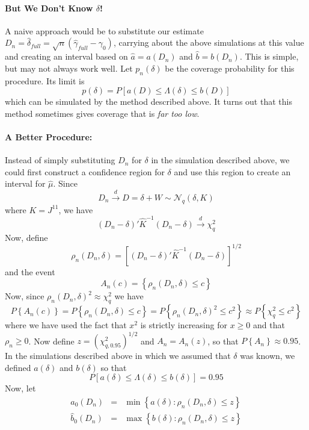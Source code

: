 \paragraph{But We Don't Know $\delta$!} A naive approach would be to substitute our estimate $D_n = \hat{\delta}_{full} = \sqrt{n}(\hat{\gamma}_{full} - \gamma_0)$, carrying about the above simulations at this value and creating an interval based on $\hat{a} = a(D_n)$ and $\hat{b}=b(D_n)$. This is simple, but may not always work well. Let $p_n(\delta)$ be the coverage probability for this procedure. Its limit is
	$$p(\delta) = P\left[a(D)\leq \Lambda(\delta) \leq b(D)  \right]$$
which can be simulated by the method described above. It turns out that this method sometimes gives coverage that is \emph{far too low}.

\paragraph{A Better Procedure:} Instead of simply substituting $D_n$ for $\delta$ in the simulation described above, we could first construct a confidence region for $\delta$ and use this region to create an interval for $\hat{\mu}$. Since 
	$$D_n \overset{d}{\rightarrow} D = \delta + W \sim \mathcal{N}_q\left(\delta,  K\right)$$
where $K = J^{11}$, we have
	$$\left(D_n - \delta\right)' \widehat{K}^{-1}\left(D_n - \delta\right) \overset{d}{\rightarrow} \chi^2_q$$
Now, define 
	$$\rho_n(D_n,\delta) =\left[\left(D_n - \delta\right)' \widehat{K}^{-1}\left(D_n - \delta\right)\right]^{1/2}$$
and the event
	$$A_n(c) = \left\{\rho_n(D_n,\delta) \leq c  \right\}$$
Now, since $\rho_n(D_n, \delta)^2 \approx \chi^2_q$ we have
		$$P\left\{A_n(c)\right\}=P\left\{\rho_n(D_n,\delta) \leq c  \right\} = P\left\{\rho_n(D_n,\delta)^2 \leq c^2  \right\} \approx P\left\{\chi^2_q \leq c^2  \right\} 
$$
where we have used the fact that $x^2$ is strictly increasing for $x\geq0$ and that $\rho_n \geq 0$. Now define $z = (\chi^2_{q,0.95})^{1/2}$ and $A_n = A_n(z)$, so that $P\left\{A_n  \right\}\approx 0.95$. In the simulations described above in which we assumed that $\delta$ was known, we defined $a(\delta)$ and $b(\delta)$ so that
	$$P\left[ a(\delta) \leq \Lambda(\delta) \leq b(\delta) \right]= 0.95$$
Now, let
	\begin{eqnarray*}
		\widehat{a}_0(D_n)&=& \min \left\{a(\delta)\colon \rho_n(D_n, \delta) \leq z\right\}\\
		\widehat{b}_0(D_n)&=& \max \left\{b(\delta)\colon \rho_n(D_n, \delta) \leq z\right\}
\end{eqnarray*}
